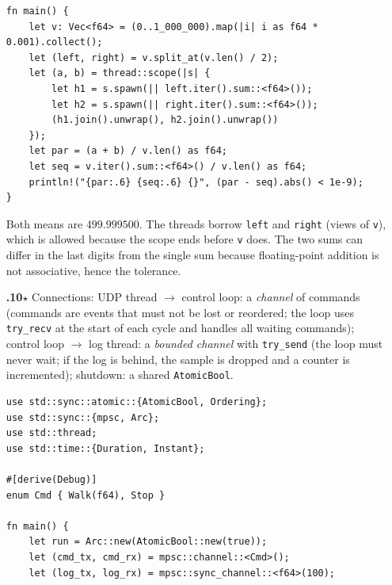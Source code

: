 \begin{enumerate}[label=\textbf{\ansnum.\arabic*}]
\begin{verbatim}
fn main() {
    let v: Vec<f64> = (0..1_000_000).map(|i| i as f64 * 0.001).collect();
    let (left, right) = v.split_at(v.len() / 2);
    let (a, b) = thread::scope(|s| {
        let h1 = s.spawn(|| left.iter().sum::<f64>());
        let h2 = s.spawn(|| right.iter().sum::<f64>());
        (h1.join().unwrap(), h2.join().unwrap())
    });
    let par = (a + b) / v.len() as f64;
    let seq = v.iter().sum::<f64>() / v.len() as f64;
    println!("{par:.6} {seq:.6} {}", (par - seq).abs() < 1e-9);
}
\end{verbatim}
Both means are $499.999500$. The threads borrow \verb!left! and \verb!right! (views of \verb!v!), which is allowed because the scope ends before \verb!v! does. The two sums can differ in the last digits from the single sum because floating-point addition is not associative, hence the tolerance.
  \item[\textbf{\ansnum.10}$\star$] Connections: UDP thread $\to$ control loop: a \emph{channel} of commands (commands are events that must not be lost or reordered; the loop uses \verb!try_recv! at the start of each cycle and handles all waiting commands); control loop $\to$ log thread: a \emph{bounded channel} with \verb!try_send! (the loop must never wait; if the log is behind, the sample is dropped and a counter is incremented); shutdown: a shared \verb!AtomicBool!.
\begin{verbatim}
use std::sync::atomic::{AtomicBool, Ordering};
use std::sync::{mpsc, Arc};
use std::thread;
use std::time::{Duration, Instant};

#[derive(Debug)]
enum Cmd { Walk(f64), Stop }

fn main() {
    let run = Arc::new(AtomicBool::new(true));
    let (cmd_tx, cmd_rx) = mpsc::channel::<Cmd>();
    let (log_tx, log_rx) = mpsc::sync_channel::<f64>(100);


\end{verbatim}
\end{enumerate}
